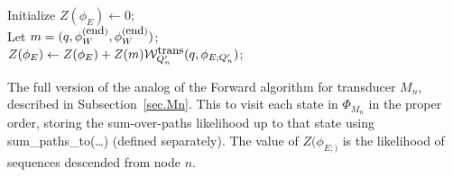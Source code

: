 \documentclass{article}
\newcommand{\secref}[1]{Subsection~\ref{sec.#1}}
\newcommand\States{\Phi}
\newcommand\statesof[1]{\States_{#1}}
\newcommand\laststate{\phi_E}
\newcommand\laststateof[1]{\phi_{E;#1}}
\newcommand\weight{{\cal W}}
\newcommand\weightfunof[1]{\weight_{#1}}
\newcommand\transweightfun[1]{\weightfunof{#1}^{\mbox{\small trans}}}
\newcommand\stateset[1]{\statesof{\mbox{\small #1}}}
\newcommand\waitsuffix{wait}
\newcommand\waitstates{\stateset{\waitsuffix}}
\newcommand\mFrom{m}
\newcommand\qFrom{q}
\newcommand\addToDPFunction{sum\_paths\_to}
\newcommand\profilewait[1]{\phi_W^{(#1)}}
\newcommand\profileterminate{\profilewait{\mbox{\small end}}}
\begin{document}
\begin{algorithm}
  Initialize $Z(\laststate) \leftarrow 0$; \\
  \ForEach{$\qFrom \in \waitstates $ } {
    Let $\mFrom = (\qFrom,\profileterminate, \profileterminate)$; \\
    $Z(\laststate) \leftarrow Z(\laststate) + Z(\mFrom) \transweightfun{Q'_n}(\qFrom,\laststateof{Q'_n})$;
  }

\caption{\label{ForwardTransducerFull}
The full version of the analog of the Forward algorithm for transducer $M_n$, 
described in \secref{Mn}. 
This to visit each state in $\statesof{M_n}$ 
in the proper order, storing the sum-over-paths likelihood
 up to that state using \addToDPFunction(\ldots) (defined separately).
The value of $Z(\laststateof)$ is the likelihood of sequences descended from node $n$. 
}
\end{algorithm}
\end{document}
